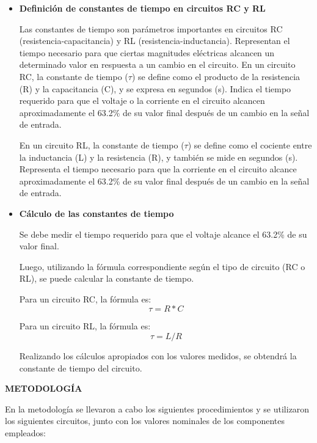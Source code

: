 \documentclass[12pt]{article}
\begin{document}
		\begin{itemize}
			\item \textbf{Definición de constantes de tiempo en circuitos RC y RL}
			
			Las constantes de tiempo son parámetros importantes en circuitos RC (resistencia-capacitancia) y RL (resistencia-inductancia). Representan el tiempo necesario para que ciertas magnitudes eléctricas alcancen un determinado valor en respuesta a un cambio en el circuito.
			En un circuito RC, la constante de tiempo ($\tau$) se define como el producto de la resistencia (R) y la capacitancia (C), y se expresa en segundos (s). Indica el tiempo requerido para que el voltaje o la corriente en el circuito alcancen aproximadamente el 63.2\% de su valor final después de un cambio en la señal de entrada.
			
			En un circuito RL, la constante de tiempo ($\tau$) se define como el cociente entre la inductancia (L) y la resistencia (R), y también se mide en segundos (s). Representa el tiempo necesario para que la corriente en el circuito alcance aproximadamente el 63.2\% de su valor final después de un cambio en la señal de entrada.
			
			\item \textbf{Cálculo de las constantes de tiempo}
			
			Se debe medir el tiempo requerido para que el voltaje alcance el 63.2\% de su valor final.
			
			Luego, utilizando la fórmula correspondiente según el tipo de circuito (RC o RL), se puede calcular la constante de tiempo.
			
			Para un circuito RC, la fórmula es: $$\tau = R * C$$
			
			Para un circuito RL, la fórmula es: $$\tau = L / R$$
			
			Realizando los cálculos apropiados con los valores medidos, se obtendrá la constante de tiempo del circuito.
		\end{itemize}

	\newpage
	
	\begin{center}
		\textbf{\large METODOLOGÍA}\\
	\end{center}
	
	En la metodología se llevaron a cabo los siguientes procedimientos y se utilizaron los siguientes circuitos, junto con los valores nominales de los componentes empleados:\\
	
\end{document}
